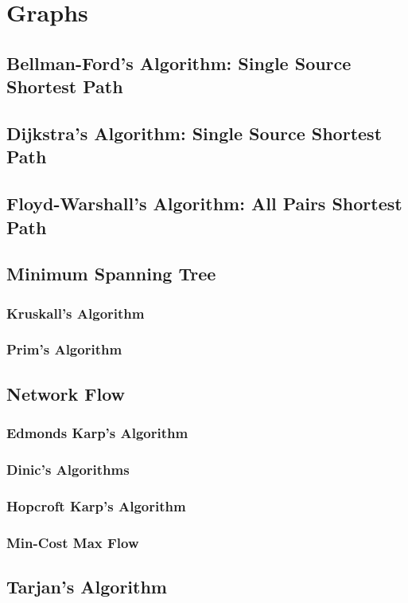 \documentclass[letterpaper,11pt,twoside]{article}
\begin{document}
        \section{Graphs}
            \subsection{Bellman-Ford's Algorithm: Single Source Shortest Path}
            \subsection{Dijkstra's Algorithm: Single Source Shortest Path}
            \subsection{Floyd-Warshall's Algorithm: All Pairs Shortest Path}
            \subsection{Minimum Spanning Tree}
                \subsubsection{Kruskall's Algorithm}
                \subsubsection{Prim's Algorithm}
            \subsection{Network Flow}
                \subsubsection{Edmonds Karp's Algorithm}
                \subsubsection{Dinic's Algorithms}
                \subsubsection{Hopcroft Karp's Algorithm}
                \subsubsection{Min-Cost Max Flow}
            \subsection{Tarjan's Algorithm}
\end{document}
